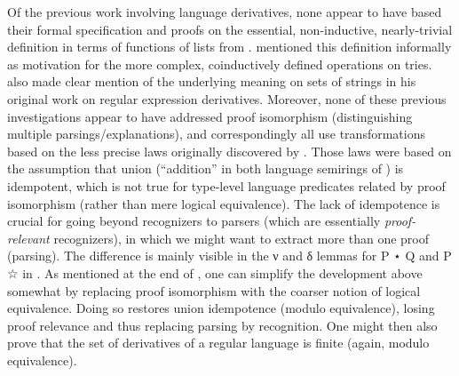 \documentclass[acmsmall,screen,timestamp]{acmart}  %
\begin{document}
Of the previous work involving language derivatives, none appear to have based their formal specification and proofs on the essential, non-inductive, nearly-trivial definition in terms of functions of lists from .
\citet{Abel2016} mentioned this definition informally as motivation for the more complex, coinductively defined operations on tries.
\citet{Brzozowski64} also made clear mention of the underlying meaning on sets of strings in his original work on regular expression derivatives.
Moreover, none of these previous investigations appear to have addressed proof isomorphism (distinguishing multiple parsings/explanations), and correspondingly all use transformations based on the less precise laws originally discovered by \citet{Brzozowski64}.
Those laws were based on the assumption that union (``addition'' in both language semirings of ) is idempotent, which is not true for type-level language predicates related by proof isomorphism (rather than mere logical equivalence).
The lack of idempotence is crucial for going beyond recognizers to parsers (which are essentially \emph{proof-relevant} recognizers), in which we might want to extract more than one proof (parsing).
The difference is mainly visible in the \AF ν and \AF δ lemmas for {\AB P ⋆ \AB Q} and {\AB P ☆} in .
As mentioned at the end of , one can simplify the development above somewhat by replacing proof isomorphism with the coarser notion of logical equivalence.
Doing so restores union idempotence (modulo equivalence), losing proof relevance and thus replacing parsing by recognition.
One might then also prove that the set of derivatives of a regular language is finite (again, modulo equivalence).


\end{document}
